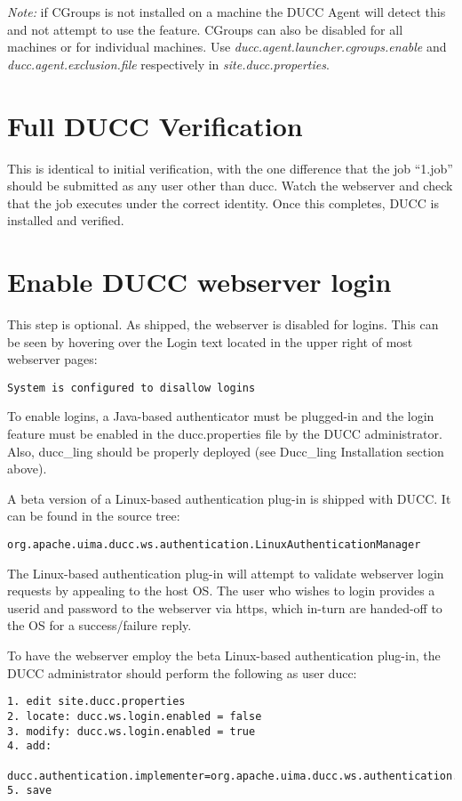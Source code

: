 {\em Note:} if CGroups is not installed on a machine the DUCC Agent will detect this and not 
  	attempt to use the feature. 
  	CGroups can also be disabled for all machines or for individual machines.
  	Use 
  	{\em ducc.agent.launcher.cgroups.enable} 
  	and 
  	{\em ducc.agent.exclusion.file}
  	respectively in
  	{\em site.ducc.properties}.
  	
\section{Full DUCC Verification}

This is identical to initial verification, with the one difference that the job ``1.job'' should be
submitted as any user other than ducc.  Watch the webserver and check that the job executes
under the correct identity.  Once this completes, DUCC is installed and verified.
 
\section{Enable DUCC webserver login}

    This step is optional.  As shipped, the webserver is disabled for
    logins.  This can be seen by hovering over the Login text located in the
    upper right of most webserver pages: 
\begin{verbatim}
System is configured to disallow logins
\end{verbatim}

    To enable logins, a Java-based authenticator must be plugged-in and the
    login feature must be enabled in the ducc.properties file by the DUCC
    administrator.  Also, ducc\_ling should be properly deployed (see 
    Ducc\_ling Installation section above).
    
    A beta version of a Linux-based authentication plug-in is shipped with DUCC.
    It can be found in the source tree:
\begin{verbatim}
org.apache.uima.ducc.ws.authentication.LinuxAuthenticationManager
\end{verbatim}

    The Linux-based authentication plug-in will attempt to validate webserver
    login requests by appealing to the host OS.  The user who wishes to
    login provides a userid and password to the webserver via https, which
    in-turn are handed-off to the OS for a success/failure reply.
    
    To have the webserver employ the beta Linux-based authentication plug-in,
    the DUCC administrator should perform the following as user ducc:
\begin{verbatim}    
1. edit site.ducc.properties
2. locate: ducc.ws.login.enabled = false
3. modify: ducc.ws.login.enabled = true
4. add:
   ducc.authentication.implementer=org.apache.uima.ducc.ws.authentication.LinuxAuthenticationManager
5. save
\end{verbatim}

